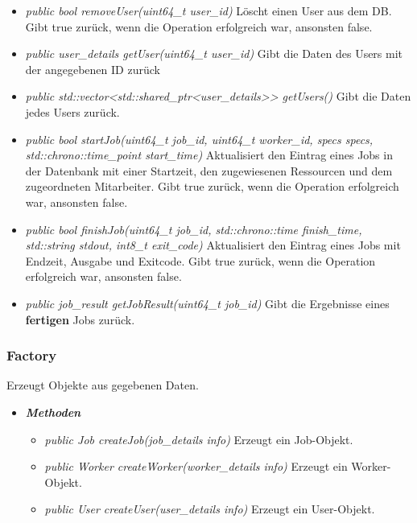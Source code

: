 \documentclass[a4paper,12pt]{article}
\begin{document}
\begin{itemize}[label={}]
\begin{itemize}[label={\textbullet}]
				\item \textit{public bool removeUser(uint64\_t user\_id)} Löscht einen User aus dem DB. Gibt true zurück, wenn die Operation erfolgreich war, ansonsten false.
				
				\item \textit{public user\_details getUser(uint64\_t user\_id)} Gibt die Daten des Users mit der angegebenen ID zurück
				
				\item \textit{public std::vector<std::shared\_ptr<user\_details>> getUsers()} Gibt die Daten jedes Users zurück.
				
				\item \textit{public bool startJob(uint64\_t job\_id, uint64\_t worker\_id, specs specs, std::chrono::time\_point start\_time)} Aktualisiert den Eintrag eines Jobs in der Datenbank mit einer Startzeit, den zugewiesenen Ressourcen und dem zugeordneten Mitarbeiter. Gibt true zurück, wenn die Operation erfolgreich war, ansonsten false.
				
				\item \textit{public bool finishJob(uint64\_t job\_id, std::chrono::time finish\_time, std::string stdout, int8\_t exit\_code)} Aktualisiert den Eintrag eines Jobs mit Endzeit, Ausgabe und Exitcode. Gibt true zurück, wenn die Operation erfolgreich war, ansonsten false.
				
				\item \textit{public job\_result getJobResult(uint64\_t job\_id)} Gibt die Ergebnisse eines \textbf{fertigen} Jobs zurück.
		\end{itemize}


\end{itemize}

\subsubsection{Factory}

Erzeugt Objekte aus gegebenen Daten.

\begin{itemize}[label={}]

	\item \textit{\textbf{Methoden}}
		\begin{itemize}[label={\textbullet}]
			\item \textit{public Job createJob(job\_details info)} Erzeugt ein Job-Objekt.
			
			\item \textit{public Worker createWorker(worker\_details info)} Erzeugt ein Worker-Objekt.
			
			\item \textit{public User createUser(user\_details info)} Erzeugt ein User-Objekt.
		\end{itemize}


\end{itemize}
\end{document}
